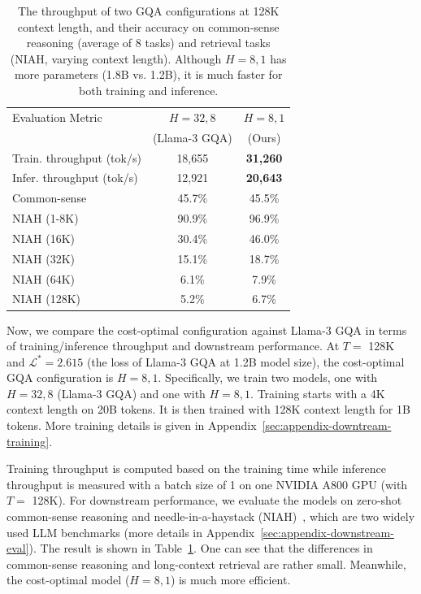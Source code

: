 \documentclass[11pt]{article}
\begin{document}
\begin{table}[!t]
    \footnotesize
    \centering
    \begin{tabular}{l|cc}
        \toprule
        Evaluation Metric    & $H=32, 8$ & $H=8,1$ \\
                                & (Llama-3 GQA) & (Ours) \\
        \midrule
        Train. throughput (tok/s)       & 18,655 & \textbf{31,260} \\
        Infer. throughput (tok/s)       & 12,921 & \textbf{20,643} \\
        \midrule
        Common-sense  & 45.7\% & 45.5\% \\
        NIAH (1-8K)   & 90.9\% & 96.9\% \\
        NIAH (16K)    & 30.4\% & 46.0\% \\
        NIAH (32K)    & 15.1\% & 18.7\% \\
        NIAH (64K)    &  6.1\% &  7.9\% \\ 
        NIAH (128K)   &  5.2\% &  6.7\% \\
        \bottomrule
    \end{tabular}
    \caption{The throughput of two GQA configurations at 128K context length, and their accuracy on common-sense reasoning (average of 8 tasks) and retrieval tasks (NIAH, varying context length). Although $H=8,1$ has more parameters (1.8B vs. 1.2B), it is much faster for both training and inference.}
    \label{tab:downstream-performance}
\end{table}

Now, we compare the cost-optimal configuration against Llama-3 GQA in terms of training/inference throughput and downstream performance. At $T = $ 128K and $\mathcal L^*=2.615$ (the loss of Llama-3 GQA at 1.2B model size), the cost-optimal GQA configuration is $H=8,1$. Specifically, we train two models, one with $H=32,8$ (Llama-3 GQA) and one with $H=8,1$. Training starts with a 4K context length on 20B tokens. It is then trained with 128K context length for 1B tokens. More training details is given in Appendix~\ref{sec:appendix-downtream-training}.

Training throughput is computed based on the training time while inference throughput is measured with a batch size of 1 on one NVIDIA A800 GPU (with $T=$ 128K). For downstream performance, we evaluate the models on zero-shot common-sense reasoning \citep{eval-harness} and needle-in-a-haystack (NIAH)~\citep{ruler}, which are two widely used LLM benchmarks (more details in Appendix~\ref{sec:appendix-downstream-eval}). The result is shown in Table~\ref{tab:downstream-performance}. One can see that the differences in common-sense reasoning and long-context retrieval are rather small. Meanwhile, the cost-optimal model ($H=8,1$) is much more efficient.
\end{document}
